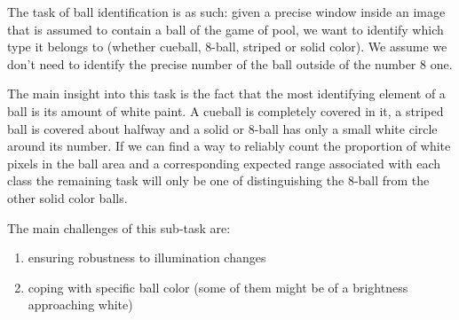 The task of ball identification is as such: 
given a precise window inside an image that is assumed to 
contain a ball of the game of pool, we want to identify 
which type it belongs to (whether cueball, 8-ball, striped or 
solid color). We assume we don't need to identify the precise 
number of the ball outside of the number 8 one.

The main insight into this task is the fact that the most 
identifying element of a ball is its amount of white paint. 
A cueball is completely covered in it, a striped ball is 
covered about halfway and a solid or 8-ball has only a small 
white circle around its number. If we can find a way to 
reliably count the proportion of white pixels in the ball area 
and a corresponding expected range associated with each class 
the remaining task will only be one of distinguishing the 
8-ball from the other solid color balls.

The main challenges of this sub-task are:
\begin{enumerate}
  \item ensuring robustness to illumination changes
  \item coping with specific ball color 
  (some of them might be of a brightness approaching white)
\end{enumerate}


